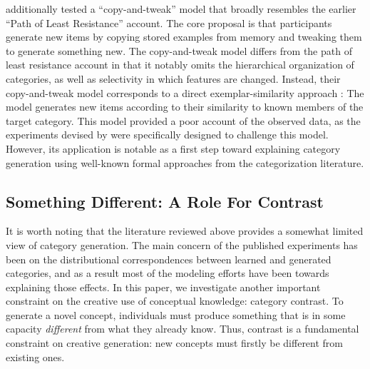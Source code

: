 \documentclass[12pt]{article}
\begin{document}
\begin{flushleft}
\cite{jern2013probabilistic} additionally tested a ``copy-and-tweak'' model that broadly resembles the earlier ``Path of Least Resistance'' account. The core proposal is that participants generate new items by copying stored examples from memory and tweaking them to generate something new. The copy-and-tweak model differs from the path of least resistance account in that it notably omits the hierarchical organization of categories, as well as selectivity in which features are changed. Instead, their copy-and-tweak model corresponds to a direct exemplar-similarity approach \citep[e.g.,][]{nosofsky1984choice,nosofsky1986attention}: The model generates new items according to their similarity to known members of the target category. This model provided a poor account of the observed data, as the experiments devised by \citeauthor{jern2013probabilistic} were specifically designed to challenge this model. However, its application is notable as a first step toward explaining category generation using well-known formal approaches from the categorization literature.


\subsection{Something Different: A Role For Contrast}

It is worth noting that the literature reviewed above provides a somewhat limited view of category generation. The main concern of the published experiments has been on the distributional correspondences between learned and generated categories, and as a result most of the modeling efforts have been towards explaining those effects. In this paper, we investigate another important constraint on the creative use of conceptual knowledge: category contrast. To generate a novel concept, individuals must produce something that is in some capacity \textit{different} from what they already know. Thus, contrast is a fundamental constraint on creative generation: new concepts must firstly be different from existing ones. 


\end{flushleft}
\end{document}
